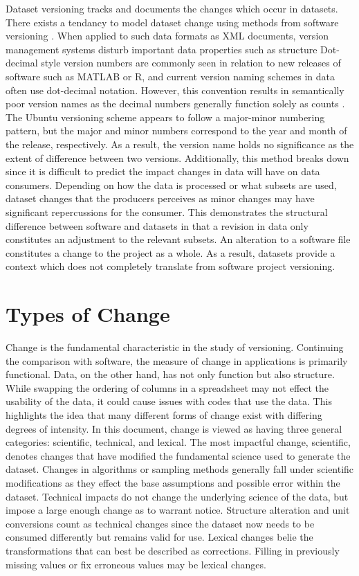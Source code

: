 Dataset versioning tracks and documents the changes which occur in datasets.
There exists a tendancy to model dataset change using methods from software versioning \cite{Chacon:2009:PG:1618548} \cite{cederqvist2002version} \cite{tichy1985rcs}.
When applied to such data formats as XML documents, version management systems disturb important data properties such as structure \cite{Chien:2000:VMX:646544.696357}
Dot-decimal style version numbers are commonly seen in relation to new releases of software such as MATLAB or R, and current version naming schemes in data often use dot-decimal notation.
However, this convention results in semantically poor version names as the decimal numbers generally function solely as counts \cite{Dijkstra1994}.
The Ubuntu versioning scheme appears to follow a major-minor numbering pattern, but the major and minor numbers correspond to the year and month of the release, respectively.
As a result, the version name holds no significance as the extent of difference between two versions.
Additionally, this method breaks down since it is difficult to predict the impact changes in data will have on data consumers.
Depending on how the data is processed or what subsets are used, dataset changes that the producers perceives as minor changes may have significant repercussions for the consumer.
This demonstrates the structural difference between software and datasets in that a revision in data only constitutes an adjustment to the relevant subsets.
An alteration to a software file constitutes a change to the project as a whole.
As a result, datasets provide a context which does not completely translate from software project versioning.

\section{Types of Change}

Change is the fundamental characteristic in the study of versioning.
Continuing the comparison with software, the measure of change in applications is primarily functional.
Data, on the other hand, has not only function but also structure.
While swapping the ordering of columns in a spreadsheet may not effect the usability of the data, it could cause issues with codes that use the data.
This highlights the idea that many different forms of change exist with differing degrees of intensity.
In this document, change is viewed as having three general categories: scientific, technical, and lexical.
The most impactful change, scientific, denotes changes that have modified the fundamental science used to generate the dataset.
Changes in algorithms or sampling methods generally fall under scientific modifications as they effect the base assumptions and possible error within the dataset.
Technical impacts do not change the underlying science of the data, but impose a large enough change as to warrant notice.
Structure alteration and unit conversions count as technical changes since the dataset now needs to be consumed differently but remains valid for use.
Lexical changes belie the transformations that can best be described as corrections.
Filling in previously missing values or fix erroneous values may be lexical changes.

